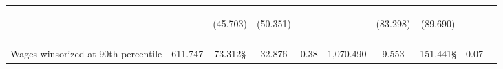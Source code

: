 \begin{tabular}{lccccccccc}
 & \begin{footnotesize}\end{footnotesize} & \begin{footnotesize}(45.703)\end{footnotesize} & \begin{footnotesize}(50.351)\end{footnotesize} & \begin{footnotesize}\end{footnotesize} & \begin{footnotesize}\end{footnotesize} & \begin{footnotesize}(83.298)\end{footnotesize} & \begin{footnotesize}(89.690)\end{footnotesize} & \begin{footnotesize}\end{footnotesize} & \begin{footnotesize}\end{footnotesize}\\
 & \begin{footnotesize}\end{footnotesize} & \begin{footnotesize}[0.224]\end{footnotesize} & \begin{footnotesize}[1.000]\end{footnotesize} & \begin{footnotesize}\end{footnotesize} & \begin{footnotesize}\end{footnotesize} & \begin{footnotesize}[1.000]\end{footnotesize} & \begin{footnotesize}[0.031]\end{footnotesize} & \begin{footnotesize}\end{footnotesize} & \begin{footnotesize}\end{footnotesize}\\
\noalign{\smallskip}Wages winsorized at 90th percentile & 611.747 & 73.312§ & 32.876 & 0.38 & 1,070.490 & 9.553 & 151.441§ & 0.07 & \\

\end{tabular}
